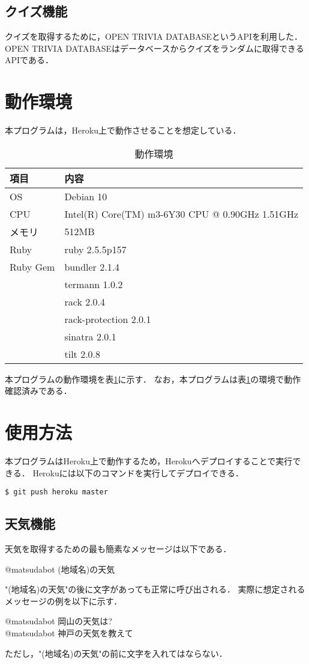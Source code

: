 \documentclass[12pt]{jsarticle}
\begin{document}
\subsection{クイズ機能}
クイズを取得するために，OPEN TRIVIA DATABASEというAPIを利用した．
OPEN TRIVIA DATABASEはデータベースからクイズをランダムに取得できるAPIである．

\section{動作環境}
本プログラムは，Heroku上で動作させることを想定している．
\begin{table}[h]
\begin{center}
\caption{動作環境}\label{tab:2}
\begin{tabular}{l|l}
\hline\hline
\multicolumn{1}{l|}{項目} & \multicolumn{1}{l}{内容}\\
\hline
OS & Debian 10\\
CPU & Intel(R) Core(TM) m3-6Y30 CPU @ 0.90GHz 1.51GHz\\
メモリ & 512MB\\
Ruby & ruby 2.5.5p157\\
Ruby Gem & bundler 2.1.4\\
& termann 1.0.2\\
& rack 2.0.4\\
& rack-protection 2.0.1\\
& sinatra 2.0.1\\ 
& tilt 2.0.8\\
\hline
\end{tabular}
\end{center}
\end{table}

本プログラムの動作環境を表\ref{tab:2}に示す．
なお，本プログラムは表\ref{tab:2}の環境で動作確認済みである．
\section{使用方法}
本プログラムはHeroku上で動作するため，Herokuへデプロイすることで実行できる．
Herokuには以下のコマンドを実行してデプロイできる．
\begin{verbatim}
$ git push heroku master
\end{verbatim}

\subsection{天気機能}
天気を取得するための最も簡素なメッセージは以下である．
\begin{center}
	@matsudabot (地域名)の天気\\
\end{center}
"(地域名)の天気"の後に文字があっても正常に呼び出される．
実際に想定されるメッセージの例を以下に示す．
\begin{center}
@matsudabot 岡山の天気は?\\
@matsudabot 神戸の天気を教えて\\
\end{center}
ただし，"(地域名)の天気"の前に文字を入れてはならない．
\end{document}
